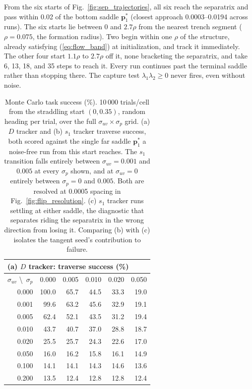 \documentclass[lettersize,journal]{IEEEtran}
\begin{document}
From the six starts of Fig.~\ref{fig:sep_trajectories}, all six reach the
separatrix and pass within 0.02 of the bottom saddle
$\mathbf{p}^*_1$ (closest approach 0.0003--0.0194 across runs). The six
starts lie between $0$ and $2.7\rho$ from the nearest trench segment
($\rho = 0.075$, the formation radius). Two begin within one $\rho$ of
the structure, already satisfying (\ref{eq:flow_band}) at
initialization, and track it immediately. The other four start
$1.1\rho$ to $2.7\rho$ off it, none bracketing the separatrix, and
take 6, 13, 18, and 35 steps to reach it. Every run continues past
the terminal saddle rather than stopping there. The capture test
$\lambda_1\lambda_2 \geq 0$ never fires, even without noise.

\begin{table}[!t]
\centering
\caption{Monte Carlo task success (\%). 10\,000 trials/cell from the
straddling start $(0, 0.35)$, random heading per trial, over the full
$\sigma_{uv} \times \sigma_p$ grid. (a) $D$ tracker and (b) $s_1$
tracker traverse success, both scored against the single far saddle
$\mathbf{p}^*_1$ a noise-free run from this start reaches. The $s_1$
transition falls entirely between $\sigma_{uv} = 0.001$ and $0.005$ at
every $\sigma_p$ shown, and at $\sigma_{uv} = 0$ entirely between
$\sigma_p = 0$ and $0.005$. Both are resolved at 0.0005 spacing in
Fig.~\ref{fig:flip_resolution}. (c) $s_1$ tracker runs settling at
either saddle, the diagnostic that separates riding the separatrix in
the wrong direction from losing it. Comparing (b) with (c) isolates the
tangent seed's contribution to failure.}
\label{tab:mc_success}
\footnotesize
\setlength{\tabcolsep}{4pt}
\begin{tabular}{r|rrrrr}
\multicolumn{6}{l}{(a) $D$ tracker: traverse success (\%)} \\
\hline
$\sigma_{uv}$ \textbackslash\ $\sigma_p$ & 0.000 & 0.005 & 0.010 & 0.020 & 0.050 \\
\hline
0.000 & 100.0 & 65.7 & 44.5 & 33.3 & 19.0 \\
0.001 &  99.6 & 63.2 & 45.6 & 32.9 & 19.1 \\
0.005 &  62.4 & 52.1 & 43.5 & 31.2 & 19.4 \\
0.010 &  43.7 & 40.7 & 37.0 & 28.8 & 18.7 \\
0.020 &  25.5 & 25.7 & 24.3 & 22.6 & 17.0 \\
0.050 &  16.0 & 16.2 & 15.8 & 16.1 & 14.9 \\
0.100 &  14.1 & 14.1 & 14.3 & 14.6 & 13.6 \\
0.200 &  13.5 & 12.4 & 12.8 & 12.8 & 12.4 \\

\end{tabular}
\end{table}
\end{document}
